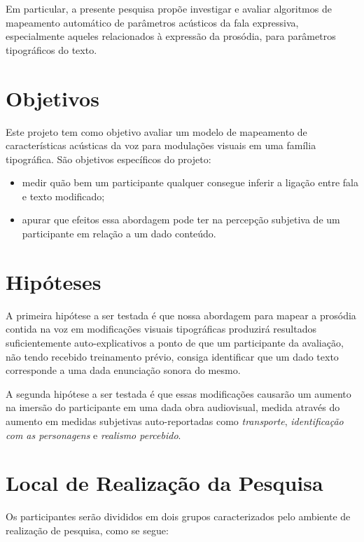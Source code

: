 \documentclass[a4paper,11pt,titlepage,singlespacing]{article}
\begin{document}
Em particular, a presente pesquisa propõe investigar e avaliar algoritmos de mapeamento automático de parâmetros acústicos da fala expressiva, especialmente aqueles relacionados à expressão da prosódia, para parâmetros tipográficos do texto.



\section{Objetivos}

\noindent Este projeto tem como objetivo avaliar um modelo de mapeamento de características acústicas da voz para modulações visuais em uma família tipográfica. 
São objetivos específicos do projeto:
\begin{itemize}
    \item medir quão bem um participante qualquer consegue inferir a ligação entre fala e texto modificado;
    \item apurar que efeitos essa abordagem pode ter na percepção subjetiva de um participante em relação a um dado conteúdo.
\end{itemize} 

\section{Hipóteses}

\noindent A primeira hipótese a ser testada é que nossa abordagem para mapear a prosódia contida na voz em modificações visuais tipográficas produzirá resultados suficientemente auto-explicativos a ponto de que um participante da avaliação, não tendo recebido treinamento prévio, consiga identificar que um dado texto corresponde a uma dada enunciação sonora do mesmo.

A segunda hipótese a ser testada é que essas modificações causarão um aumento na imersão do participante em uma dada obra audiovisual, medida através do aumento em medidas subjetivas auto-reportadas como \textit{transporte}, \textit{identificação com as personagens} e \textit{realismo percebido}.

\section{Local de Realização da Pesquisa}

\noindent Os participantes serão divididos em dois grupos caracterizados pelo ambiente de realização de pesquisa, como se segue:
\end{document}
